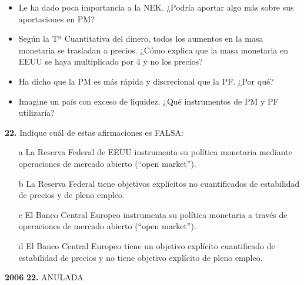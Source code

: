 \documentclass{nuevotema}
\begin{document}
\begin{itemize}
    \item Le ha dado poca importancia a la NEK. ¿Podría aportar algo más sobre sus aportaciones en PM?
    \item Según la Tª Cuantitativa del dinero, todos los aumentos en la masa monetaria se trasladan a precios. ¿Cómo explica que la masa monetaria en EEUU se haya multiplicado por 4 y no los precios?
    \item Ha dicho que la PM es más rápida y discrecional que la PF. ¿Por qué?
    \item Imagine un país con exceso de liquidez. ¿Qué instrumentos de PM y PF utilizaría?
\end{itemize}



\textbf{22.} Indique cuál de estas afirmaciones es FALSA:

\begin{itemize}
	\item[a] La Reserva Federal de EEUU instrumenta su política monetaria mediante operaciones de mercado abierto (``open market'').
	\item[b] La Reserva Federal tiene objetivos explícitos no cuantificados de estabilidad de precios y de pleno empleo.
	\item[c] El Banco Central Europeo instrumenta su política monetaria a través de operaciones de mercado abierto (``open market'').
	\item[d] El Banco Central Europeo tiene un objetivo explícito cuantificado de estabilidad de precios y no tiene objetivo explícito de pleno empleo.
\end{itemize}


\notas


\textbf{2006} \textbf{22.} ANULADA

\bibliografia
\end{document}
